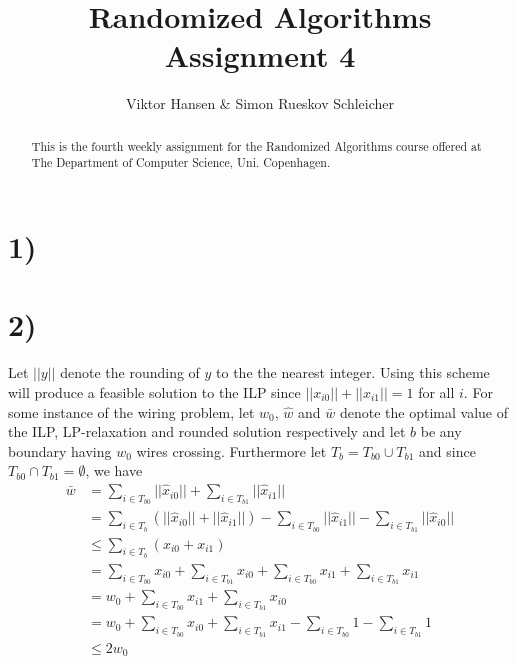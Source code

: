 \documentclass[12pt]{article}
\begin{document}
\nocite{*}


\title{Randomized Algorithms \\
       Assignment 4}

\author{Viktor Hansen \& Simon Rueskov Schleicher}

\maketitle

\begin{abstract}
  This is the fourth weekly assignment for the Randomized Algorithms course offered at The Department of Computer Science, Uni. Copenhagen.
\end{abstract}

\pagebreak

\section*{1)}

\section*{2)}
Let $||y||$ denote the rounding of $y$ to the the nearest integer. Using this scheme will produce a feasible solution to the ILP since $||x_{i0}|| + ||x_{i1}|| = 1$ for all $i$. For some instance of the wiring problem, let $w_0$, $\hat{w}$ and $\bar{w}$ denote the optimal value of the ILP, LP-relaxation and rounded solution respectively and let $b$ be any boundary having $w_0$ wires crossing. Furthermore let $T_b=T_{b0} \cup T_{b1}$ and since $T_{b0} \cap T_{b1} = \emptyset$, we have
\begin{align*}
\bar{w} &= \sum_{i \in T_{b0}} || \hat{x}_{i0} || + \sum_{i \in T_{b1}} || \hat{x}_{i1} || \\
&=\sum_{i \in T_{b}} \left( ||\hat{x}_{i0} || + ||\hat{x}_{i1}|| \right) - \sum_{i \in T_{b0}} ||\hat{x}_{i1} || - \sum_{i \in T_{b1}} ||\hat{x}_{i0} || \\
&\leq\sum_{i \in T_{b}} \left( x_{i0} + x_{i1} \right) \\
&=\sum_{i \in T_{b0}} x_{i0} + \sum_{i \in T_{b1}} x_{i0} + \sum_{i \in T_{b0}} x_{i1} + \sum_{i \in T_{b1}} x_{i1} \\
&=w_0 + \sum_{i \in T_{b0}} x_{i1} + \sum_{i \in T_{b1}} x_{i0} \\
&=w_0 + \sum_{i \in T_{b0}} x_{i0} + \sum_{i \in T_{b1}} x_{i1} - \sum_{i \in T_{b0}} 1 - \sum_{i \in T_{b1}} 1 \\
&\leq 2w_0
\end{align*}
\end{document}
